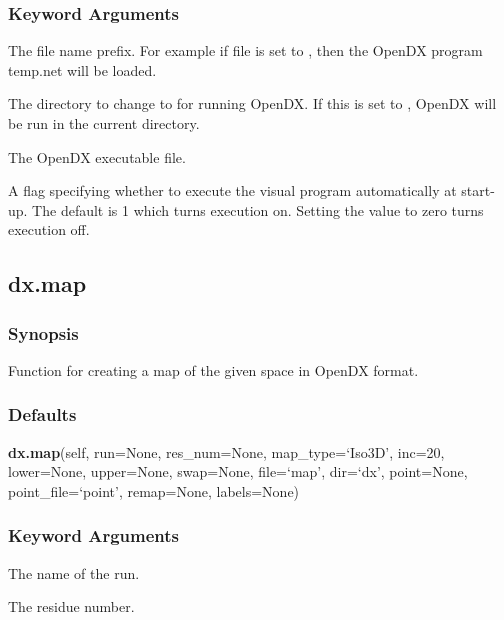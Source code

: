 \subsubsection{Keyword Arguments}

  The file name prefix.  For example if file is set to , then the OpenDX program temp.net will be loaded. 

  The directory to change to for running OpenDX.  If this is set to , OpenDX will be run in the current directory. 

  The OpenDX executable file. 

  A flag specifying whether to execute the visual program automatically at start-up.  The default is 1 which turns execution on.  Setting the value to zero turns execution off. 





\newpage

\subsection{dx.map}


\subsubsection{Synopsis}

Function for creating a map of the given space in OpenDX format.



\subsubsection{Defaults}

\textsf{\textbf{dx.map}(self, run=None, res\_num=None, map\_type=`Iso3D', inc=20, lower=None, upper=None, swap=None, file=`map', dir=`dx', point=None, point\_file=`point', remap=None, labels=None)}


\subsubsection{Keyword Arguments}

  The name of the run. 

  The residue number. 

